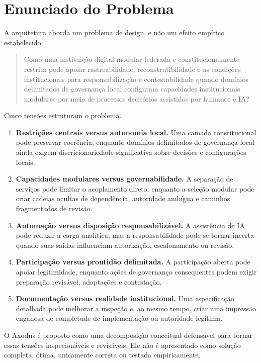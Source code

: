 \documentclass[11pt]{article}
\begin{document}
\section{Enunciado do Problema}

A arquitetura aborda um problema de design, e não um efeito empírico
estabelecido:

\begin{quote}
Como uma instituição digital modular federada e constitucionalmente restrita
pode apoiar rastreabilidade, reconstrutibilidade e as condições institucionais
para responsabilização e contestabilidade quando domínios delimitados de
governança local configuram capacidades institucionais modulares por meio de
processos decisórios assistidos por humanos e IA?
\end{quote}

Cinco tensões estruturam o problema.

\begin{enumerate}[leftmargin=*]
\item \textbf{Restrições centrais versus autonomia local.} Uma camada
constitucional pode preservar coerência, enquanto domínios delimitados de
governança local ainda exigem discricionariedade significativa sobre decisões
e configurações locais.
\item \textbf{Capacidades modulares versus governabilidade.} A separação de
serviços pode limitar o acoplamento direto, enquanto a seleção modular pode
criar cadeias ocultas de dependência, autoridade ambígua e caminhos
fragmentados de revisão.
\item \textbf{Automação versus disposição responsabilizável.} A assistência
de IA pode reduzir a carga analítica, mas a responsabilidade pode se tornar
incerta quando suas saídas influenciam autorização, escalonamento ou revisão.
\item \textbf{Participação versus prontidão delimitada.} A participação aberta
pode apoiar legitimidade, enquanto ações de governança consequentes podem
exigir preparação revisável, adaptações e contestação.
\item \textbf{Documentação versus realidade institucional.} Uma especificação
detalhada pode melhorar a inspeção e, ao mesmo tempo, criar uma impressão
enganosa de completude de implementação ou autoridade legítima.
\end{enumerate}

O Axodus é proposto como uma decomposição conceitual defensável para tornar
essas tensões inspecionáveis e revisáveis. Ele não é apresentado como solução
completa, ótima, unicamente correta ou testada empiricamente.
\end{document}
